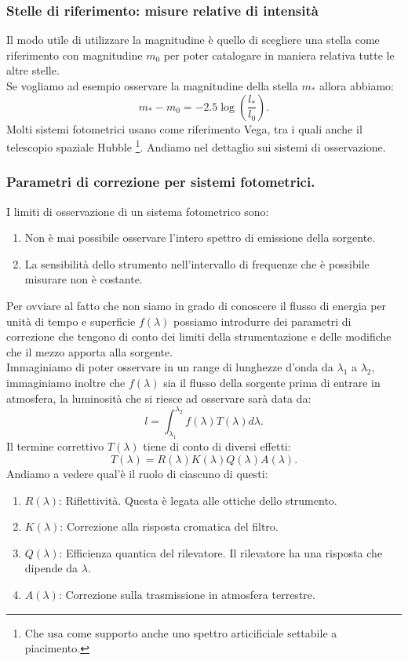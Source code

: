 \subsubsection{Stelle di riferimento: misure relative di intensità}
Il modo utile di utilizzare la magnitudine è quello di scegliere una stella come riferimento con magnitudine $m_0$ per poter catalogare in maniera relativa tutte le altre stelle.\\
Se vogliamo ad esempio osservare la magnitudine della stella $m_*$ allora abbiamo:
\[
	m_{*}- m_0 = -2.5 \log \left( \frac{l_{*}}{l_0} \right) 
.\] 
Molti sistemi fotometrici usano come riferimento Vega, tra i quali anche il telescopio spaziale Hubble \footnote{Che usa come supporto anche uno spettro articificiale settabile a piacimento.}. Andiamo nel dettaglio sui sistemi di osservazione.
\subsubsection{Parametri di correzione per sistemi fotometrici.}
\label{subsubsec:Parametri di correzione per sistemi fotometrici.}
I limiti di osservazione di un sistema fotometrico sono:
\begin{enumerate}
	\item Non è mai possibile osservare l'intero spettro di emissione della sorgente.
	\item La sensibilità dello strumento nell'intervallo di frequenze che è possibile misurare non è costante.
\end{enumerate}
Per ovviare al fatto che non siamo in grado di conoscere il flusso di energia per unità di tempo e superficie $f( \lambda ) $ possiamo introdurre dei parametri di correzione che tengono di conto dei limiti della strumentazione e delle modifiche che il mezzo apporta alla sorgente.\\
Immaginiamo di poter osservare in un range di lunghezze d'onda da $\lambda_1$ a $\lambda_2$, immaginiamo inoltre che $f( \lambda ) $ sia il flusso della sorgente prima di entrare in atmosfera, la luminosità che si riesce ad osservare sarà data da:
\[
	l = \int_{\lambda_1}^{\lambda_2} f( \lambda ) T(\lambda) d\lambda   
.\] 
Il termine correttivo $T( \lambda ) $ tiene di conto di diversi effetti:
\[
	T( \lambda ) = R( \lambda ) K( \lambda ) Q( \lambda ) A( \lambda ) 
.\] 
Andiamo a vedere qual'è il ruolo di ciascuno di questi:
\begin{enumerate}
	\item $R( \lambda ) $: Riflettività. Questa è legata alle ottiche dello strumento.
	\item $K( \lambda ) $: Correzione alla risposta cromatica del filtro.
	\item $Q( \lambda ) $: Efficienza quantica del rilevatore. 
		Il rilevatore ha una risposta che dipende da $\lambda $.
	\item $A( \lambda ) $: Correzione sulla trasmissione in atmosfera terrestre.
\end{enumerate}
